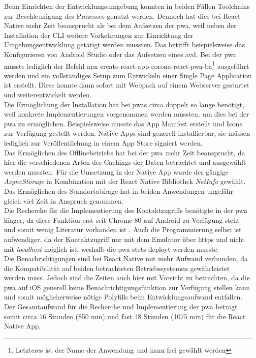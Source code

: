 Beim Einrichten der Entwicklungsumgebung konnten in beiden Fällen Toolchains zur Beschleunigung des Prozesses genutzt werden.
Dennoch hat dies bei React Native mehr Zeit beansprucht als bei dem Aufsetzen der \ac{pwa}, weil neben der Installation der CLI weitere Vorkehrungen zur Einrichtung der Umgebungsentwicklung getätigt werden mussten.
Das betrifft beispielsweise das Konfigurieren von Android Studio oder das Aufsetzen eines \ac{avd}.
Bei der \ac{pwa} musste lediglich der Befehl \glqq npx create-react-app corona-react-pwa-ba\grqq{}\footnote{Letzteres ist der Name der Anwendung und kann frei gewählt werden} ausgeführt werden und ein vollständiges Setup zum Entwickeln einer Single Page Application ist erstellt.
Diese konnte dann sofort mit Webpack auf einem Webserver gestartet und weiterentwickelt werden.\\
Die Ermöglichung der Installation hat bei \acp{pwa} circa doppelt so lange benötigt, weil konkrete Implementierungen vorgenommen werden mussten, um dies bei der \ac{pwa} zu ermöglichen.
Beispielsweise musste das App Manifest erstellt und Icons zur Verfügung gestellt werden.
Native Apps sind generell installierbar, sie müssen lediglich zur Veröffentlichung in einem App Store signiert werden.\\
Das Ermöglichen des Offlinebetriebs hat bei der \ac{pwa} mehr Zeit beansprucht, da hier die verschiedenen Arten des Cachings der Daten betrachtet und ausgewählt werden mussten.
Für die Umsetzung in der Native App wurde der gängige \textit{AsyncStorage} in Kombination mit der React Native Bibliothek \textit{NetInfo} gewählt.\\
Das Ermöglichen des Standortabfrage hat in beiden Anwendungen ungefähr gleich viel Zeit in Anspruch genommen.\\
Die Recherche für die Implementierung des Kontaktzugriffs benötigte in der \ac{pwa} länger, da diese Funktion erst seit Chrome 80 auf Android zu Verfügung steht und somit wenig Literatur vorhanden ist \cite{Beverloo.2021}.
Auch die Programmierung selbst ist aufwendiger, da der Kontaktzugriff nur mit dem Emulator über \ac{https} und nicht mit \textit{localhost} möglich ist, weshalb die \ac{pwa} stets deployt werden musste.\\
Die Benachrichtigungen sind bei React Native mit mehr Aufwand verbunden, da die Kompatibilität auf beiden betrachteten Betriebssystemen gewährleistet werden muss.
Jedoch sind die Zeiten auch hier mit Vorsicht zu betrachten, da die \ac{pwa} auf iOS generell keine Benachrichtigungsfunktion zur Verfügung stellen kann und somit möglicherweise nötige Polyfills beim Entwicklungsaufwand entfallen.\\
Der Gesamtaufwand für die Recherche und Implementierung der \ac{pwa} beträgt somit circa 16 Stunden (850 min) und fast 18 Stunden (1075 min) für die React Native App. 

